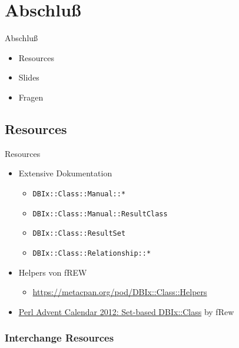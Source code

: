 \section{Abschluß}

\begin{frame}{Abschluß}
\begin{itemize}
\item Resources
\item Slides
\item Fragen
\end{itemize}
\end{frame}

\subsection{Resources}
\begin{frame}[fragile]{Resources}
\begin{itemize}
\item Extensive Dokumentation
\begin{itemize}
\item \verb|DBIx::Class::Manual::*|
\item \verb|DBIx::Class::Manual::ResultClass|
\item \verb|DBIx::Class::ResultSet|
\item \verb|DBIx::Class::Relationship::*|
\end{itemize}
\item Helpers von fREW
\begin{itemize}
\item \href{https://metacpan.org/pod/DBIx::Class::Helpers}{https://metacpan.org/pod/DBIx::Class::Helpers}
\end{itemize}
\item \href{http://www.perladvent.org/2012/2012-12-21.html}
{Perl Advent Calendar 2012: Set-based DBIx::Class}
by fRew
\end{itemize}


\end{frame}

\subsubsection{Interchange Resources}

